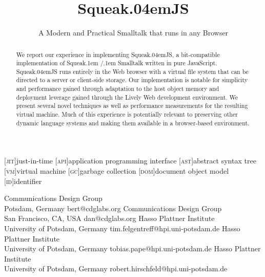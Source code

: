\documentclass[natbib]{sigplanconf}
\newcommand*\SqueakJS{Squeak\texorpdfstring{\kern.04em}{}JS\xspace}
\newcommand*\SqueakST{Squeak\kern.1em /\kern.1em\penalty0 Smalltalk\xspace}
\newcommand*\JS{JavaScript\xspace}
\newcommand*\SqueakJSTitle{\SqueakJS}
\newcommand*\SqueakJSSubtitle{A Modern and Practical Smalltalk that runs in any Browser}
\begin{document}
\exclusivelicense
{}

%
[\textsc{jit}]{just-in-time}
[\textsc{api}]{application programming interface}
[\textsc{ast}]{abstract syntax tree}
[\textsc{vm}]{virtual machine}
[\textsc{gc}]{garbage collection}
[\textsc{dom}]{document object model}
[\textsc{id}]{identifier}
\title{\SqueakJSTitle}
\subtitle{\SqueakJSSubtitle}

           {Communications Design Group\\Potsdam, Germany}
           {bert@cdglabs.org}
           {Communications Design Group\\San Francisco, CA, USA}
           {dan@cdglabs.org}
           {Hasso Plattner Institute\\University of Potsdam, Germany}
           {tim.felgentreff@hpi.uni-potsdam.de}
           {Hasso Plattner Institute\\University of Potsdam, Germany}
           {tobias.pape@hpi.uni-potsdam.de}
           {Hasso Plattner Institute\\University of Potsdam, Germany}
           {robert.hirschfeld@hpi.uni-potsdam.de}

\maketitle

\begin{abstract}
  We report our experience in implementing \SqueakJS, a bit-compatible
  implementation of \SqueakST written in pure \JS. \SqueakJS runs
  entirely in the Web browser with a virtual file system that can be
  directed to a server or client-side storage. Our implementation is
  notable for simplicity and performance gained through adaptation to
  the host object memory and deployment leverage gained through the
  Lively Web development environment. We present several novel
  techniques as well as performance measurements for the resulting
  virtual machine. Much of this experience is potentially relevant to
  preserving other dynamic language systems and making them available
  in a browser-based environment.
\end{abstract}
\end{document}
